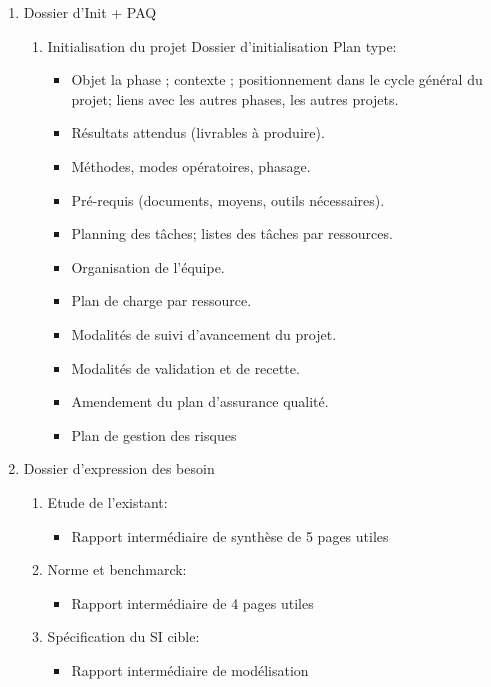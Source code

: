 \begin{enumerate}
	\item Dossier d'Init + PAQ
		\begin{enumerate}
			\item Initialisation du projet
				Dossier d'initialisation
					Plan type:
						\begin{itemize}
							\item Objet la phase ; contexte ; positionnement dans le cycle général du projet; liens avec les autres phases, les autres projets.
							\item Résultats attendus (livrables à produire).
							\item Méthodes, modes opératoires, phasage.
							\item Pré-requis (documents, moyens, outils nécessaires).
							\item Planning des tâches; listes des tâches par ressources.
							\item Organisation de l’équipe.
							\item Plan de charge par ressource.
							\item Modalités de suivi d’avancement du projet.
							\item Modalités de validation et de recette.
							\item Amendement du plan d’assurance qualité.
							\item Plan de gestion des risques
						\end{itemize}
		\end{enumerate}
	\item Dossier d'expression des besoin
		\begin{enumerate}
			\item Etude de l'existant:
				\begin{itemize}
					\item Rapport intermédiaire de synthèse de 5 pages utiles
				\end{itemize}
			\item Norme et benchmarck:
				\begin{itemize} 
					\item Rapport intermédiaire de 4 pages utiles
				\end{itemize}
			\item Spécification du SI cible:
				\begin{itemize} 
					\item Rapport intermédiaire de modélisation
				\end{itemize}
		\end{enumerate}


\end{enumerate}
